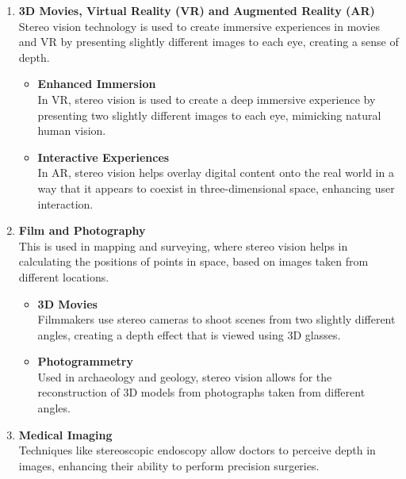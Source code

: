 \documentclass[22pt]{report}
\begin{document}
\begin{enumerate}
\begin{itemize}
                \end{itemize}
            \item \textbf{3D Movies, Virtual Reality (VR) and Augmented Reality (AR)}\\
                 Stereo vision technology is used to create immersive experiences in movies and VR by presenting slightly different images to each eye, creating a sense of depth.
                 \begin{itemize}
                     \item \textbf{Enhanced Immersion}\\
                         In VR, stereo vision is used to create a deep immersive experience by presenting two slightly different images to each eye, mimicking natural human vision.
                     \item \textbf{Interactive Experiences}\\
                         In AR, stereo vision helps overlay digital content onto the real world in a way that it appears to coexist in three-dimensional space, enhancing user interaction.
                 \end{itemize}   
            \item \textbf{Film and Photography}\\
                 This is used in mapping and surveying, where stereo vision helps in calculating the positions of points in space, based on images taken from different locations.
                 \begin{itemize}
                     \item \textbf{3D Movies} \\
                         Filmmakers use stereo cameras to shoot scenes from two slightly different angles, creating a depth effect that is viewed using 3D glasses.
                    \item \textbf{Photogrammetry}\\
                        Used in archaeology and geology, stereo vision allows for the reconstruction of 3D models from photographs taken from different angles.
                 \end{itemize}
            \item \textbf{Medical Imaging}\\
                 Techniques like stereoscopic endoscopy allow doctors to perceive depth in images, enhancing their ability to perform precision surgeries.
                 \begin{itemize}

\end{itemize}
\end{enumerate}
\end{document}
